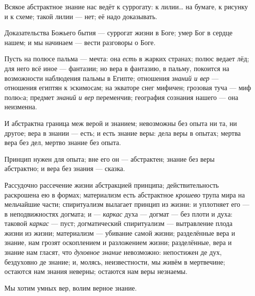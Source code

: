 \documentclass[12pt,a4paper,oneside]{book}
\begin{document}
Всякое абстрактное знание нас ведёт к суррогату: к лилии… на бумаге, к рисунку и к схеме; такой лилии — нет; её надо доказывать.

Доказательства Божьего бытия — суррогат жизни в Боге; умер Бог в сердце нашем; и мы начинаем — вести разговоры о Боге.

Пусть на полюсе пальма — мечта: она \emph{есть} в жарких странах; полюс ведает лёд; для него всё иное — фантазии; но вера в фантазию, в пальму, покоится на возможности наблюдения пальмы в Египте; отношения \emph{знаний и вер} — отношения египтян к эскимосам; на экваторе снег мифичен; грозовая туча — миф полюcа; предмет \emph{знаний и вер} переменчив; география сознания нашего — она неизменна.

И абстрактна граница меж верой и знанием; невозможны без опыта ни та, ни другое; вера в знании — есть; и есть знание веры: дела веры в опытах; мертва вера без дел, мертво знание без опыта.

Принцип нужен для опыта; вне его он — абстрактен; знание без веры абстрактно; и вера без знания — сказка.

Рассудочно рассечение жизни абстракцией принципа; действительность раскрошена ею в формах; материализм есть абстрактное \emph{крошево} трупа мира на мельчайшие части; спиритуализм вылагает принцип из жизни: и уплотняет его — в неподвижностях догмата; и — \emph{каркас} духа — догмат — без плоти и духа: таковой \emph{каркас} — пуст; догматический спиритуализм — вытравление плода жизни из жизни; материализм — убивание самой жизни; разделённые вера и знание, нам грозят оскоплением и разложением жизни; разделённые, вера и знание нам гласят, что \emph{духовное знание} невозможно: непостижен де дух, бездуховно де знание; и, молясь, неизвестности, мы живём в мертвечине; остаются нам знания неверны; остаются нам веры незнаемы.

Мы хотим умных вер, волим верное знание.
\end{document}
